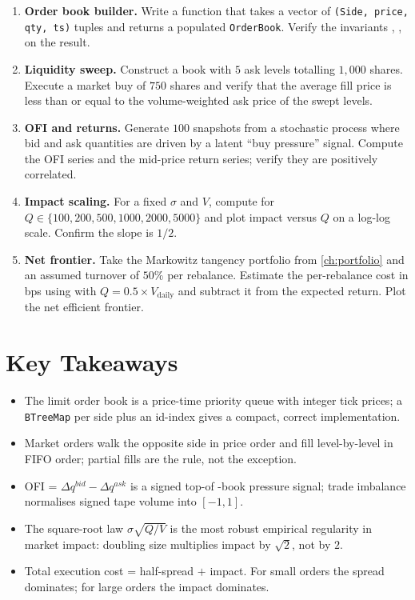 \begin{enumerate}
    \item \textbf{Order book builder.} Write a function that takes a
      vector of \texttt{(Side, price, qty, ts)} tuples and returns a
      populated \texttt{OrderBook}. Verify the invariants
      , ,  on the
      result.
    \item \textbf{Liquidity sweep.} Construct a book with $5$ ask
      levels totalling $1{,}000$ shares. Execute a market buy of
      $750$ shares and verify that the average fill price is less than
      or equal to the volume-weighted ask price of the swept levels.
    \item \textbf{OFI and returns.} Generate $100$ snapshots from a
      stochastic process where bid and ask quantities are driven by a
      latent ``buy pressure'' signal. Compute the OFI series and the
      mid-price return series; verify they are positively correlated.
    \item \textbf{Impact scaling.} For a fixed $\sigma$ and $V$,
      compute  for $Q \in \{100, 200, 500, 1000,
      2000, 5000\}$ and plot impact versus $Q$ on a log-log scale.
      Confirm the slope is $1/2$.
    \item \textbf{Net frontier.} Take the Markowitz tangency portfolio
      from \cref{ch:portfolio} and an assumed turnover of $50\%$ per
      rebalance. Estimate the per-rebalance cost in bps using
       with $Q = 0.5 \times V_{\text{daily}}$
      and subtract it from the expected return. Plot the net efficient
      frontier.
\end{enumerate}

\section{Key Takeaways}

\begin{itemize}
    \item The limit order book is a price-time priority queue with
      integer tick prices; a \texttt{BTreeMap} per side plus an
      id-index gives a compact, correct implementation.
    \item Market orders walk the opposite side in price order and fill
      level-by-level in FIFO order; partial fills are the rule, not
      the exception.
    \item OFI = $\Delta q^{bid} - \Delta q^{ask}$ is a signed top-of
      -book pressure signal; trade imbalance normalises signed tape
      volume into $[-1, 1]$.
    \item The square-root law $\sigma\sqrt{Q/V}$ is the most robust
      empirical regularity in market impact: doubling size multiplies
      impact by $\sqrt{2}$, not by $2$.
    \item Total execution cost = half-spread $+$ impact. For small
      orders the spread dominates; for large orders the impact
      dominates.
\end{itemize}